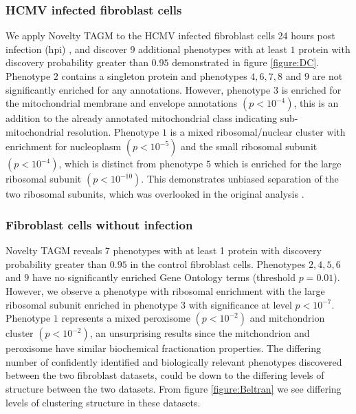 \documentclass[12pt,english]{article}
\begin{document}
\subsubsection{HCMV infected fibroblast cells} 
We apply Novelty TAGM to the HCMV infected fibroblast cells 24 hours post infection (hpi) \citep{Jean_Beltran:2016}, and discover $9$ additional phenotypes with at least $1$ protein with discovery probability greater than $0.95$ demonstrated in figure \ref{figure:DC}. Phenotype $2$ contains a singleton protein and phenotypes $4,6,7,8$ and $9$ are not significantly enriched for any annotations. However, phenotype $3$ is enriched for the mitochondrial membrane and envelope annotations $(p < 10^{-4})$, this is an addition to the already annotated mitochondrial class indicating sub-mitochondrial resolution. Phenotype $1$ is a mixed ribosomal/nuclear cluster with enrichment for nucleoplasm $(p < 10^{-5})$ and the small ribosomal subunit $(p < 10^{-4})$, which is distinct from phenotype $5$ which is enriched for the large ribosomal subunit $(p < 10^{-10})$. This demonstrates unbiased separation of the two ribosomal subunits, which was overlooked in the original analysis \citep{Jean_Beltran:2016}.

\subsubsection{Fibroblast cells without infection} 
Novelty TAGM reveals $7$ phenotypes with at least 1 protein with discovery probability greater than $0.95$ in the control fibroblast cells. Phenotypes $2,4,5,6$ and $9$ have no significantly enriched Gene Ontology terms (threshold $p = 0.01$). However, we observe a phenotype with ribosomal enrichment with the large ribosomal subunit enriched in phenotype $3$ with significance at level  $p < 10^{-7} $. Phenotype $1$ represents a mixed peroxisome $(p < 10^{-2})$ and mitchondrion cluster $(p < 10 ^{-2})$, an unsurprising results since the mitchondrion and peroxisome have similar biochemical fractionation properties. The differing number of confidently identified and biologically relevant phenotypes discovered between the two fibroblast datasets, could be down to the differing levels of structure between the two datasets. From figure \ref{figure:Beltran} we see differing levels of clustering structure in these datasets.
\end{document}
